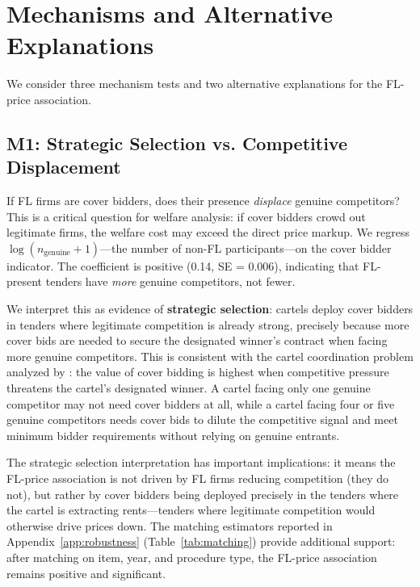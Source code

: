 \section{Mechanisms and Alternative Explanations}
\label{sec:mechanisms}

We consider three mechanism tests and two alternative explanations for the FL-price association.

\subsection{M1: Strategic Selection vs. Competitive Displacement}

If FL firms are cover bidders, does their presence \textit{displace} genuine competitors? This is a critical question for welfare analysis: if cover bidders crowd out legitimate firms, the welfare cost may exceed the direct price markup. We regress $\log(n_{\text{genuine}} + 1)$---the number of non-FL participants---on the cover bidder indicator. The coefficient is positive (0.14, SE = 0.006), indicating that FL-present tenders have \textit{more} genuine competitors, not fewer.

We interpret this as evidence of \textbf{strategic selection}: cartels deploy cover bidders in tenders where legitimate competition is already strong, precisely because more cover bids are needed to secure the designated winner's contract when facing more genuine competitors. This is consistent with the cartel coordination problem analyzed by \citet{marshall2012economics}: the value of cover bidding is highest when competitive pressure threatens the cartel's designated winner. A cartel facing only one genuine competitor may not need cover bidders at all, while a cartel facing four or five genuine competitors needs cover bids to dilute the competitive signal and meet minimum bidder requirements without relying on genuine entrants.

The strategic selection interpretation has important implications: it means the FL-price association is not driven by FL firms reducing competition (they do not), but rather by cover bidders being deployed precisely in the tenders where the cartel is extracting rents---tenders where legitimate competition would otherwise drive prices down. The matching estimators reported in Appendix~\ref{app:robustness} (Table~\ref{tab:matching}) provide additional support: after matching on item, year, and procedure type, the FL-price association remains positive and significant.

